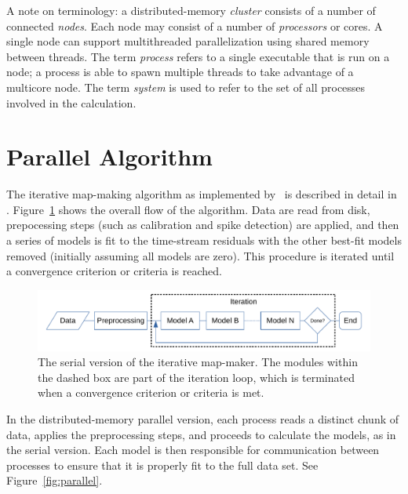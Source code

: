 \documentclass[oneside,11pt]{starlink}
\begin{document}
A note on terminology: a distributed-memory \textit{cluster\/}
consists of a number of connected \textit{nodes}. Each node may
consist of a number of \textit{processors\/} or cores. A single node
can support multithreaded parallelization using shared memory between
threads. The term \textit{process\/} refers to a single executable
that is run on a node; a process is able to spawn multiple threads to
take advantage of a multicore node. The term \textit{system\/} is used
to refer to the set of all processes involved in the calculation.

\section{Parallel Algorithm\label{se:algorithm}}

The iterative map-making algorithm as implemented by \makemap\ is
described in detail in \cite{chapin2013}. Figure~\ref{fig:serial}
shows the overall flow of the algorithm. Data are read from disk,
prepocessing steps (such as calibration and spike detection) are
applied, and then a series of models is fit to the time-stream
residuals with the other best-fit models removed (initially
assuming all models are zero). This procedure is iterated until a
convergence criterion or criteria is reached.

\begin{figure}[ht]
\begin{center}
\includegraphics[width=\textwidth]{ssn79_serial_flowchart}
\caption[Serial flow chart]{The serial version of the iterative
  map-maker. The modules within the dashed box are part of the
  iteration loop, which is terminated when a convergence criterion or
  criteria is met.}
\label{fig:serial}
\end{center}
\end{figure}

In the distributed-memory parallel version, each process reads a
distinct chunk of data, applies the preprocessing steps, and proceeds
to calculate the models, as in the serial version. Each model is then
responsible for communication between processes to ensure that it is
properly fit to the full data set. See Figure~\ref{fig:parallel}.
\end{document}
